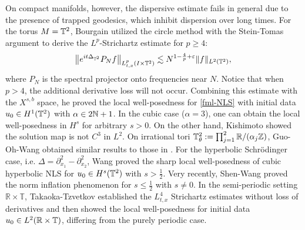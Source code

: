 \documentclass[10pt,a4paper]{amsart}
\numberwithin{equation}{section}
\newcommand{\R}{\Bbb R}
\begin{document}
On compact manifolds, however, the dispersive estimate fails in general due to the presence of trapped geodesics, which inhibit dispersion over long times. For the  torus $M=\Bbb T^2$, Bourgain \cite{Bour} utilized the circle method with the  Stein-Tomas argument to derive the $L^p$-Strichartz estimate for $p \geq 4$:
\begin{align}\label{tori}
\big\|e^{it\Delta_{\Bbb T^2}}P_Nf\big\|_{L_{t,x}^p(I\times\Bbb T^2)}\lesssim N^{1-\frac{4}{p}+\varepsilon}\|f\|_{L^2(\Bbb T^2)},
\end{align}
where   $P_N$ is the spectral projector onto  frequencies near $N$. Notice that when $p>4$, the additional derivative loss will not occur.  Combining this estimate with the $X^{s,b}$ space, he proved the local well-posedness for \eqref{fml-NLS} with initial data $u_0\in H^1(\Bbb T^2)$ with $\alpha\in2\Bbb N+1$. In the cubic case ($\alpha=3$), one can obtain the local well-posedness in $H^s$ for arbitrary $s>0$. On the other hand,  Kishimoto \cite{Kishimoto} showed the solution map is not $C^3$ in $L^2$. On irrational tori  $\Bbb T_\theta^2:=\prod_{j=1}^2\R/(\alpha_j\Bbb Z)$, Guo-Oh-Wang \cite{GTW} obtained similar results to those in \cite{Bour}. For the hyperbolic Schr\"odinger case, i.e. $\Delta=\partial_{x_1}^2-\partial_{x_2}^2$, Wang \cite{Wang2} proved the sharp local well-posedness of cubic hyperbolic NLS for $u_0\in H^s(\Bbb T^2)$ with $s>\frac{1}{2}$. Very recently, Shen-Wang \cite{Shen} proved the norm inflation phenomenon for $s\leq\frac12$ with $s\neq0$. In the semi-periodic setting $\mathbb{R} \times \mathbb{T}$, Takaoka-Tzvetkov \cite{TT} established the $L_{t,x}^4$ Strichartz estimates without loss of derivatives and then showed the  local well-posedness for initial data $u_0\in L^2(\R\times\Bbb T)$, differing from the purely periodic case.
	
\end{document}
